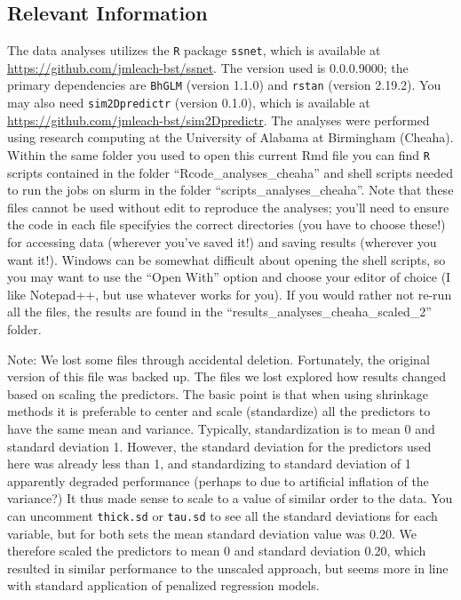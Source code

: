 \documentclass[
]{article}
\begin{document}
\hypertarget{relevant-information}{%
\subsection{Relevant Information}\label{relevant-information}}

The data analyses utilizes the \texttt{R} package \texttt{ssnet}, which
is available at \url{https://github.com/jmleach-bst/ssnet}. The version
used is 0.0.0.9000; the primary dependencies are \texttt{BhGLM} (version
1.1.0) and \texttt{rstan} (version 2.19.2). You may also need
\texttt{sim2Dpredictr} (version 0.1.0), which is available at
\url{https://github.com/jmleach-bst/sim2Dpredictr}. The analyses were
performed using research computing at the University of Alabama at
Birmingham (Cheaha). Within the same folder you used to open this
current Rmd file you can find \texttt{R} scripts contained in the folder
``Rcode\_analyses\_cheaha'' and shell scripts needed to run the jobs on
slurm in the folder ``scripts\_analyses\_cheaha''. Note that these files
cannot be used without edit to reproduce the analyses; you'll need to
ensure the code in each file specifyies the correct directories (you
have to choose these!) for accessing data (wherever you've saved it!)
and saving results (wherever you want it!). Windows can be somewhat
difficult about opening the shell scripts, so you may want to use the
``Open With'' option and choose your editor of choice (I like Notepad++,
but use whatever works for you). If you would rather not re-run all the
files, the results are found in the
``results\_analyses\_cheaha\_scaled\_2'' folder.

Note: We lost some files through accidental deletion. Fortunately, the
original version of this file was backed up. The files we lost explored
how results changed based on scaling the predictors. The basic point is
that when using shrinkage methods it is preferable to center and scale
(standardize) all the predictors to have the same mean and variance.
Typically, standardization is to mean 0 and standard deviation 1.
However, the standard deviation for the predictors used here was already
less than 1, and standardizing to standard deviation of 1 apparently
degraded performance (perhaps to due to artificial inflation of the
variance?) It thus made sense to scale to a value of similar order to
the data. You can uncomment \texttt{thick.sd} or \texttt{tau.sd} to see
all the standard deviations for each variable, but for both sets the
mean standard deviation value was 0.20. We therefore scaled the
predictors to mean 0 and standard deviation 0.20, which resulted in
similar performance to the unscaled approach, but seems more in line
with standard application of penalized regression models.
\end{document}
